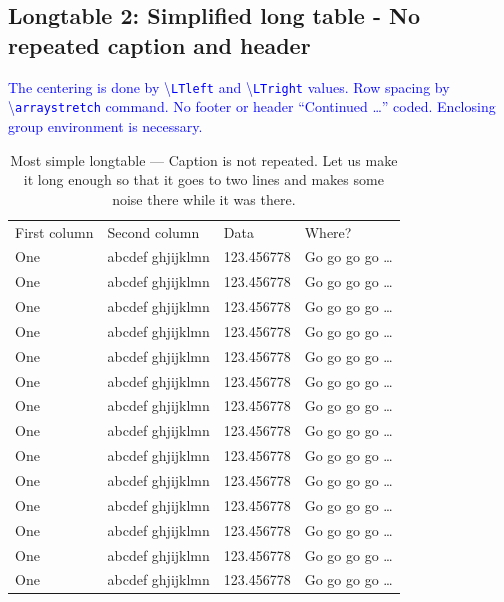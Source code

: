 \documentclass[phd,showgrids]{ndsu-thesis-2022}
\newcommand\italk[1]{\textcolor{blue}{#1}}  %
\newcommand\cmd[1]{\textbackslash\texttt{#1}}  %
\begin{document}
\subsection{Longtable 2: Simplified long table - No repeated caption and header}

\italk{The centering is done by \cmd{LTleft} and \cmd{LTright} values. Row spacing by \cmd{arraystretch} command. No footer or header ``Continued \ldots'' coded. Enclosing group environment is necessary.}

\begingroup
\setlength{\LTleft}{1mm plus -1fill}%
\setlength{\LTright}{\LTleft}%
\renewcommand{\arraystretch}{0.5}%
\begin{longtable}{l l l l}
\captionsetup{width=\textwidth}
\caption{Most simple longtable --- Caption is not repeated. Let us make it long enough so that it goes to two lines and makes some noise there while it was there.}\\[-20pt]%
\toprule
First column & Second column & Data & Where?\\
\midrule
One & abcdef ghjijklmn & 123.456778  & Go go go go \ldots \\
One & abcdef ghjijklmn & 123.456778  & Go go go go \ldots \\
One & abcdef ghjijklmn & 123.456778  & Go go go go \ldots \\
One & abcdef ghjijklmn & 123.456778  & Go go go go \ldots \\
One & abcdef ghjijklmn & 123.456778  & Go go go go \ldots \\
One & abcdef ghjijklmn & 123.456778  & Go go go go \ldots \\
One & abcdef ghjijklmn & 123.456778  & Go go go go \ldots \\
One & abcdef ghjijklmn & 123.456778  & Go go go go \ldots \\
One & abcdef ghjijklmn & 123.456778  & Go go go go \ldots \\
One & abcdef ghjijklmn & 123.456778  & Go go go go \ldots \\
One & abcdef ghjijklmn & 123.456778  & Go go go go \ldots \\
One & abcdef ghjijklmn & 123.456778  & Go go go go \ldots \\
One & abcdef ghjijklmn & 123.456778  & Go go go go \ldots \\
One & abcdef ghjijklmn & 123.456778  & Go go go go \ldots \\

\end{longtable}
\end{document}
